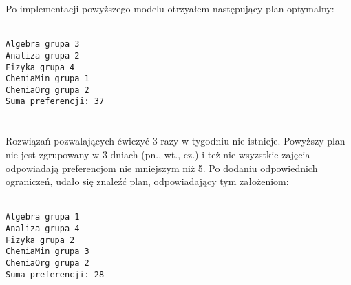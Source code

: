 \documentclass[12pt, a4paper]{article}
\begin{document}
Po implementacji powyższego modelu otrzyałem następujący plan optymalny:

\texttt{\\
Algebra   grupa 3\\
Analiza   grupa 2\\
Fizyka    grupa 4\\
ChemiaMin grupa 1\\
ChemiaOrg grupa 2\\
Suma preferencji: 37\\\\
}
\\
Rozwiązań pozwalających ćwiczyć 3 razy w tygodniu nie istnieje.
Powyższy plan nie jest zgrupowany w 3 dniach (pn., wt., cz.) i też nie wsyzstkie zajęcia odpowiadają preferencjom
nie mniejszym niż 5. Po dodaniu odpowiednich ograniczeń, udało się znaleźć plan, odpowiadający tym założeniom:

\texttt{\\
Algebra grupa 1\\
Analiza grupa 4\\
Fizyka grupa 2\\
ChemiaMin grupa 3\\
ChemiaOrg grupa 2\\
Suma preferencji: 28\\
}
\end{document}
